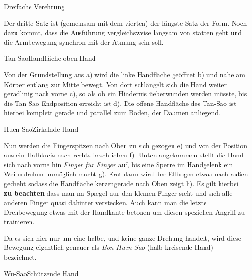 \begin{WTSatz}{Dreifache Verehrung}%
	
	
	Der dritte Satz ist (gemeinsam mit dem vierten) der l\"angste Satz der Form. Noch dazu kommt, dass die Ausf\"uhrung vergleichsweise langsam von statten geht und die Armbewegung synchron mit der Atmung sein soll.
	
	\begin{WTSatzTeil}{Tan-Sao}{Handfl\"ache-oben Hand}
		
		Von der Grundstellung aus a) wird die linke Handfl\"ache ge\"offnet b) und nahe am K\"orper entlang zur Mitte bewegt. Von dort schl\"angelt sich die Hand weiter geradlinig nach vorne c), so als ob ein Hindernis \"ueberwunden werden m\"usste, bis die Tan Sao Endposition erreicht ist d). Die offene Handfl\"ache des Tan-Sao ist hierbei komplett gerade und parallel zum Boden, der Daumen anliegend.
		
	\end{WTSatzTeil}
	\begin{WTSatzTeil}{Huen-Sao}{Zirkelnde Hand}
		
		Nun werden die Fingerspitzen nach Oben zu sich gezogen e) und von der Position aus ein Halbkreis nach rechts beschrieben f). Unten angekommen stellt die Hand sich nach vorne hin \textit{Finger f\"ur Finger} auf, bis eine Sperre im Handgelenk ein Weiterdrehen unm\"oglich macht g). Erst dann wird der Ellbogen etwas nach au{\ss}en gedreht sodass die Handfl\"ache kerzengerade nach Oben zeigt h). Es gilt hierbei \textbf{zu beachten} dass man im Spiegel nur den kleinen Finger sieht und sich alle anderen Finger quasi dahinter verstecken. Auch kann man die letzte Drehbewegung etwas mit der Handkante betonen um diesen speziellen Angriff zu trainieren.
		
		\begin{WTCommonBegriff}
			Da es sich hier nur um eine halbe, und keine ganze Drehung handelt, wird diese Bewegung eigentlich genauer als \textit{Bon Huen Sao} (halb kreisende Hand) bezeichnet.
		\end{WTCommonBegriff}

	\end{WTSatzTeil}
	\begin{WTSatzTeil}{Wu-Sao}{Sch\"utzende Hand}
		

\end{WTSatzTeil}
\end{WTSatz}
